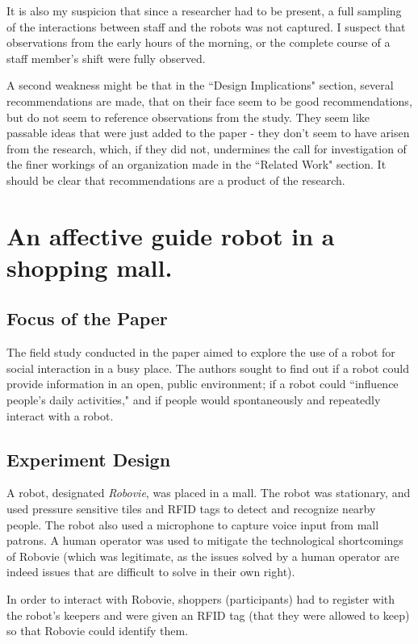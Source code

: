 \documentclass{article}
\begin{document}
It is also my suspicion that since a researcher had to be present, a full sampling of the interactions between staff and the robots was not captured. I suspect that observations from the early hours of the morning, or the complete course of a staff member's shift were fully observed.

A second weakness might be that in the ``Design Implications" section, several recommendations are made, that on their face seem to be good recommendations, but do not seem to reference observations from the study. They seem like passable ideas that were just added to the paper - they don't seem to have arisen from the research, which, if they did not, undermines the call for investigation of the finer workings of an organization made in the ``Related Work" section. It should be clear that recommendations are a product of the research.


\section{An affective guide robot in a shopping mall.}

\subsection{Focus of the Paper}
The field study conducted in the paper aimed to explore the use of a robot for social interaction in a busy place. The authors sought to find out if a robot could provide information in an open, public environment; if a robot could ``influence people's daily activities," and if people would spontaneously and repeatedly interact with a robot.

\subsection{Experiment Design}
A robot, designated \emph{Robovie}, was placed in a mall. The robot was stationary, and used pressure sensitive tiles and RFID tags to detect and recognize nearby people. The robot also used a microphone to capture voice input from mall patrons. A human operator was used to mitigate the technological shortcomings of Robovie (which was legitimate, as the issues solved by a human operator are indeed issues that are difficult to solve in their own right).

In order to interact with Robovie, shoppers (participants) had to register with the robot's keepers and were given an RFID tag (that they were allowed to keep) so that Robovie could identify them.
\end{document}
